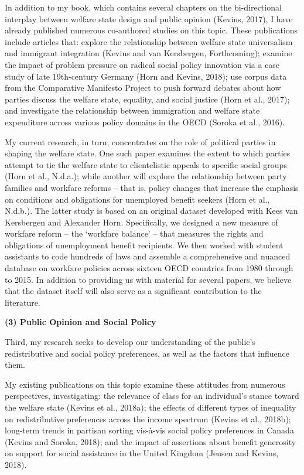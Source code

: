 \documentclass[letterpaper]{scrartcl}
\begin{document}
  In addition to my book, which contains several chapters on the bi-directional interplay between welfare state design and public opinion (Kevins, 2017), I have already published numerous co-authored studies on this topic. These publications include articles that: explore the relationship between welfare state universalism and immigrant integration (Kevins and van Kersbergen, Forthcoming); examine the impact of problem pressure on radical social policy innovation via a case study of late 19th-century Germany (Horn and Kevins, 2018); use corpus data from the Comparative Manifesto Project to push forward debates about how parties discuss the welfare state, equality, and social justice (Horn et al., 2017); and investigate the relationship between immigration and welfare state expenditure across various policy domains in the OECD (Soroka et al., 2016).

  My current research, in turn, concentrates on the role of political parties in shaping the welfare state. One such paper examines the extent to which parties attempt to tie the welfare state to clientelistic appeals to specific social groups (Horn et al., N.d.a.); while another will explore the relationship between party families and workfare reforms -- that is, policy changes that increase the emphasis on conditions and obligations for unemployed benefit seekers (Horn et al., N.d.b.). The latter study is based on an original dataset developed with Kees van Kersbergen and Alexander Horn. Specifically, we designed a new measure of workfare reform -- the ‘workfare balance’ -- that measures the rights and obligations of unemployment benefit recipients. We then worked with student assistants to code hundreds of laws and assemble a comprehensive and nuanced database on workfare policies across sixteen OECD countries from 1980 through to 2015. In addition to providing us with material for several papers, we believe that the dataset itself will also serve as a significant contribution to the literature.

  \textbf{(3) Public Opinion and Social Policy}
  \vspace{-1em}

  Third, my research seeks to develop our understanding of the public’s redistributive and social policy preferences, as well as the factors that influence them.

  My existing publications on this topic examine these attitudes from numerous perspectives, investigating: the relevance of class for an individual's stance toward the welfare state (Kevins et al., 2018a); the effects of different types of inequality on redistributive preferences across the income spectrum (Kevins et al., 2018b); long-term trends in partisan sorting vis-à-vis social policy preferences in Canada (Kevins and Soroka, 2018); and the impact of assertions about benefit generosity on support for social assistance in the United Kingdom (Jensen and Kevins, 2018).
\end{document}
